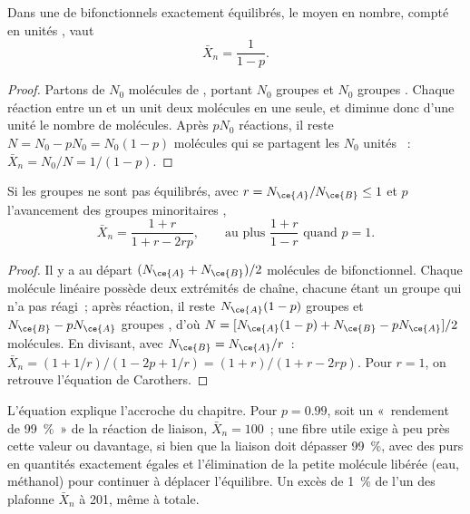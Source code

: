 \begin{theorem}\label{thm:b2:polymer-synthesis:carothers}
Dans une  de  bifonctionnels exactement équilibrés, le  moyen en nombre, compté en unités , vaut
\begin{equation*}
\bar X_n = \frac{1}{1 - p}.
\end{equation*}
\end{theorem}

\begin{proof}
Partons de $N_0$ molécules de , portant $N_0$ groupes  et $N_0$ groupes . Chaque
réaction entre un  et un  unit deux molécules en une seule, et diminue donc d'une unité le
nombre de molécules. Après $pN_0$ réactions, il reste $N = N_0 - pN_0 = N_0(1-p)$ molécules qui se
partagent les $N_0$ unités ~: $\bar X_n = N_0/N = 1/(1-p)$.
\end{proof}

\begin{corollary}[Déséquilibre]\label{cor:b2:polymer-synthesis:imbalance}
Si les groupes ne sont pas équilibrés, avec $r = N_{\ce{A}}/N_{\ce{B}} \le 1$ et $p$ l'avancement des
groupes minoritaires ,
\begin{equation*}
\bar X_n = \frac{1 + r}{1 + r - 2rp}, \qquad \text{au plus } \frac{1+r}{1-r} \text{ quand } p = 1.
\end{equation*}
\end{corollary}

\begin{proof}
Il y a au départ $(N_{\ce{A}} + N_{\ce{B}})/2$ molécules de  bifonctionnel. Chaque molécule
linéaire possède deux extrémités de chaîne, chacune étant un groupe qui n'a pas réagi~; après réaction,
il reste $N_{\ce{A}}(1-p)$ groupes  et $N_{\ce{B}} - pN_{\ce{A}}$ groupes , d'où $N = [N_{\ce{A}}(1-p) + N_{\ce{B}} -
pN_{\ce{A}}]/2$ molécules. En divisant, avec $N_{\ce{B}} = N_{\ce{A}}/r$~:
$\bar X_n = (1 + 1/r)/(1 - 2p + 1/r) = (1+r)/(1 + r - 2rp)$. Pour $r = 1$, on retrouve l'équation de Carothers.
\end{proof}

L'équation explique l'accroche du chapitre. Pour $p = 0.99$, soit un «~rendement de 99~\%~» de la réaction de liaison, $\bar X_n =
100$~; une fibre utile exige à peu près cette valeur ou davantage, si bien que la liaison doit dépasser
99~\%, avec des  purs en quantités exactement égales et l'élimination de la petite molécule
libérée (eau, méthanol) pour continuer à déplacer l'équilibre. Un excès de 1~\% de l'un des 
plafonne $\bar X_n$ à 201, même à  totale.

